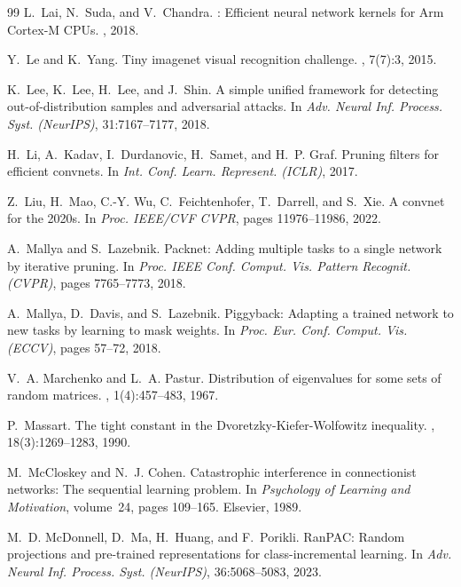 \documentclass{article}
\begin{document}
\begin{thebibliography}{99}
L.~Lai, N.~Suda, and V.~Chandra.
: Efficient neural network kernels for {Arm Cortex-M} {CPUs}.
, 2018.

Y.~Le and K.~Yang.
\newblock Tiny imagenet visual recognition challenge.
, 7(7):3, 2015.

K.~Lee, K.~Lee, H.~Lee, and J.~Shin.
\newblock A simple unified framework for detecting out-of-distribution samples and adversarial attacks.
\newblock In {\em Adv. Neural Inf. Process. Syst. (NeurIPS)}, 31:7167--7177, 2018.

H.~Li, A.~Kadav, I.~Durdanovic, H.~Samet, and H.~P. Graf.
\newblock Pruning filters for efficient convnets.
\newblock In {\em Int. Conf. Learn. Represent. (ICLR)}, 2017.

Z.~Liu, H.~Mao, C.-Y. Wu, C.~Feichtenhofer, T.~Darrell, and S.~Xie.
\newblock A convnet for the 2020s.
\newblock In {\em Proc. IEEE/CVF CVPR}, pages 11976--11986, 2022.

A.~Mallya and S.~Lazebnik.
\newblock Packnet: Adding multiple tasks to a single network by iterative pruning.
\newblock In {\em Proc. IEEE Conf. Comput. Vis. Pattern Recognit. (CVPR)}, pages 7765--7773, 2018.

A.~Mallya, D.~Davis, and S.~Lazebnik.
\newblock Piggyback: Adapting a trained network to new tasks by learning to mask weights.
\newblock In {\em Proc. Eur. Conf. Comput. Vis. (ECCV)}, pages 57--72, 2018.

V.~A. Marchenko and L.~A. Pastur.
\newblock Distribution of eigenvalues for some sets of random matrices.
, 1(4):457--483, 1967.

P.~Massart.
\newblock The tight constant in the {Dvoretzky-Kiefer-Wolfowitz} inequality.
, 18(3):1269--1283, 1990.

M.~McCloskey and N.~J. Cohen.
\newblock Catastrophic interference in connectionist networks: The sequential learning problem.
\newblock In {\em Psychology of Learning and Motivation}, volume~24, pages 109--165. Elsevier, 1989.

M.~D. McDonnell, D.~Ma, H.~Huang, and F.~Porikli.
\newblock Ran{PAC}: Random projections and pre-trained representations for class-incremental learning.
\newblock In {\em Adv. Neural Inf. Process. Syst. (NeurIPS)}, 36:5068--5083, 2023.


\end{thebibliography}
\end{document}
